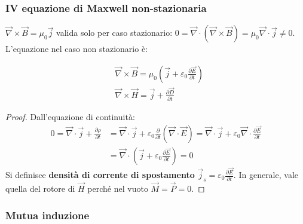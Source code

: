 \documentclass[10pt, a4paper]{scrartcl}
\numberwithin{equation}{subsection}
\theoremstyle{style1}
\newenvironment{boxenv}[1][]{
    \begin{eqbox}[#1]
    }{
   \end{eqbox}
}
\begin{document}
\subsubsection{IV equazione di Maxwell non-stazionaria}

$\vec{\nabla }\times \vec{B} = \mu_0 \vec{j}$ valida solo per caso stazionario: $0=\vec{\nabla }\cdot (\vec{\nabla }\times \vec{B}) = \mu_0 \vec{\nabla }\cdot \vec{j}\neq 0$. L'equazione nel caso non stazionario \`e:

\begin{equation}
	\begin{split}
		&\vec{\nabla }\times \vec{B} = \mu_0 \left(\vec{j}+\varepsilon _0 \frac{\partial \vec{E}}{\partial t} \right) \\
		&\vec{\nabla }\times \vec{H} = \vec{j}+\frac{\partial \vec{D}}{\partial t} 
	\end{split} 
\end{equation}
\begin{boxenv}[]
\begin{proof}
	Dall'equazione di continuit\`a:
	\[
	\begin{split}
		0=\vec{\nabla }\cdot \vec{j} + \frac{\partial \rho }{\partial t}  &= \vec{\nabla }\cdot \vec{j}+\varepsilon _0 \frac{\partial }{\partial t} (\vec{\nabla }\cdot \vec{E}) = \vec{\nabla }\cdot \vec{j}+ \varepsilon _0 \vec{\nabla }\cdot \frac{\partial \vec{E}}{\partial t} \\
										&=\vec{\nabla }\cdot \left(\vec{j} + \varepsilon _0\frac{\partial \vec{E}}{\partial t} \right) =0
	\end{split}
	\] 
	Si definisce \textbf{densit\`a di corrente di spostamento} $\vec{j}_s = \varepsilon _0 \frac{\partial \vec{E}}{\partial t} $. In generale, vale quella del rotore di $\vec{H}$ perch\'e nel vuoto $\vec{M} = \vec{P} = 0 $.
\end{proof}
\end{boxenv}
\subsubsection{Mutua induzione}
\end{document}
